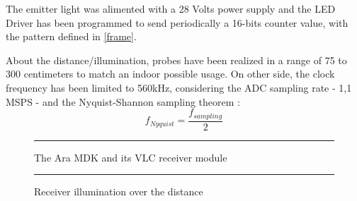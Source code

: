 The emitter light was alimented with a 28 Volts power supply and the LED Driver has been programmed to send periodically a 16-bits counter value, with the pattern defined in \ref{frame}.

About the distance/illumination, probes have been realized in a range of 75 to 300 centimeters to match an indoor possible usage. On other side, the clock frequency has been limited to 560kHz, considering the ADC sampling rate - 1,1 MSPS - and the Nyquist-Shannon sampling theorem : 
\begin{equation}
f_{Nyquist}  = \frac{f_{sampling}}{2}
\label{eq:nyquist}
\end{equation}

\begin{figure}[htbp]
  \centering
    \rule{35em}{0.5pt}
  \caption[The Ara MDK and its VLC receiver module]{The Ara MDK and its VLC receiver module}
  \label{fig:receiver}
\end{figure}

\begin{figure}[htbp]
	\centering
		\rule{35em}{0.5pt}
		\caption{Receiver illumination over the distance}
		\label{fig:led}
	\end{figure}

